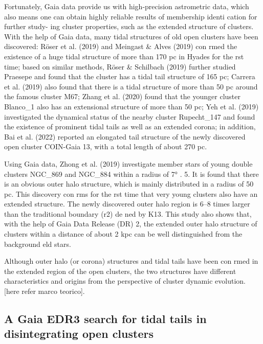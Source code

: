 \documentclass[../Main.tex]{subfiles}
\begin{document}
{Fortunately, Gaia data provide us with high-precision
astrometric data, which also means one can obtain highly
reliable results of membership identi cation for further study-
ing cluster properties, such as the extended structure of clusters.
With the help of Gaia data, many tidal structures of old open
clusters have been discovered: Röser et al. (2019) and Meingast
& Alves (2019) con rmed the existence of a huge tidal
structure of more than 170 pc in Hyades for the rst time; based
on similar methods, Röser & Schilbach (2019) further studied
Praesepe and found that the cluster has a tidal tail structure of
165 pc; Carrera et al. (2019) also found that there is a tidal
structure of more than 50 pc around the famous cluster M67;
Zhang et al. (2020) found that the younger cluster Blanco_1
also has an extensional structure of more than 50 pc; Yeh et al.
(2019) investigated the dynamical status of the nearby cluster
Rupecht_147 and found the existence of prominent tidal tails as
well as an extended corona; in addition, Bai et al. (2022)
reported an elongated tail structure of the newly discovered
open cluster COIN-Gaia 13, with a total length of about 270 pc.

Using Gaia data, Zhong et al. (2019) investigate member
stars of young double clusters NGC_869 and NGC_884 within
a radius of 7° . 5. It is found that there is an obvious outer halo
structure, which is mainly distributed in a radius of 50 pc. This
discovery con rms for the rst time that very young clusters
also have an extended structure. The newly discovered outer
halo region is 6–8 times larger than the traditional boundary
(r2) de ned by K13. This study also shows that, with the help
of Gaia Data Release (DR) 2, the extended outer halo structure
of clusters within a distance of about 2 kpc can be well
distinguished from the background eld stars.

Although outer halo (or corona) structures and tidal tails
have been con rmed in the extended region of the open
clusters, the two structures have different characteristics and origins from the perspective of cluster dynamic evolution. [here refer marco teorico].

\subsection{A Gaia EDR3 search for tidal tails in disintegrating open clusters}



}
\end{document}
